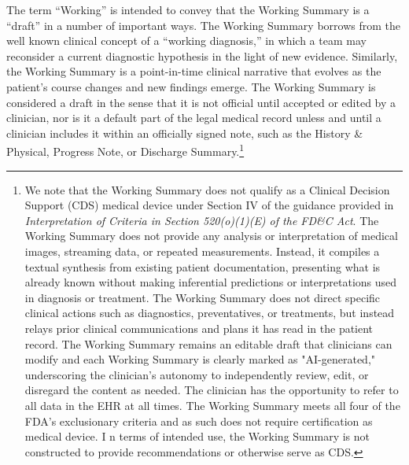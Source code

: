 \documentclass{style/myclass}
\begin{document}
The term “Working” is intended to convey that the Working Summary is a “draft” in a number of important ways. The Working Summary borrows from the well known clinical concept of a “working diagnosis,” in which a team may reconsider a current diagnostic hypothesis in the light of new evidence. Similarly, the Working Summary is a point-in-time clinical narrative that evolves as the patient’s course changes and new findings emerge. The Working Summary is considered a draft in the sense that it is not official until accepted or edited by a clinician, nor is it a default part of the legal medical record unless and until a clinician includes it within an officially signed note, such as the History \& Physical, Progress Note, or Discharge Summary.\footnote{We note that the Working Summary does not qualify as a Clinical Decision Support (CDS) medical device under Section IV of the guidance provided in \textit{Interpretation of Criteria in Section 520(o)(1)(E) of the FD\&C Act}. The Working Summary does not provide any analysis or interpretation of medical images, streaming data, or repeated measurements. Instead, it compiles a textual synthesis from existing patient documentation, presenting what is already known without making inferential predictions or interpretations used in diagnosis or treatment. The Working Summary does not direct specific clinical actions such as diagnostics, preventatives, or treatments, but instead relays prior clinical communications and plans it has read in the patient record. The Working Summary remains an editable draft that clinicians can modify and each Working Summary is clearly marked as "AI-generated," underscoring the clinician's autonomy to independently review, edit, or disregard the content as needed. The clinician has the opportunity to refer to all data in the EHR at all times. The Working Summary meets all four of the FDA's exclusionary criteria and as such does not require certification as medical device. I n terms of intended use, the Working Summary is not constructed to provide recommendations or otherwise serve as CDS.}
\end{document}
